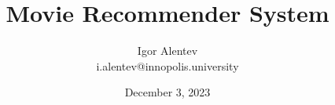 \documentclass{article}
\title{Movie Recommender System}
\author{Igor Alentev \\ i.alentev@innopolis.university}
\date{December 3, 2023}
\begin{document}
\maketitle

\newpage

\begin{multicols*}{2}

    

    

    

    

    

    

    

\end{multicols*}
\end{document}
